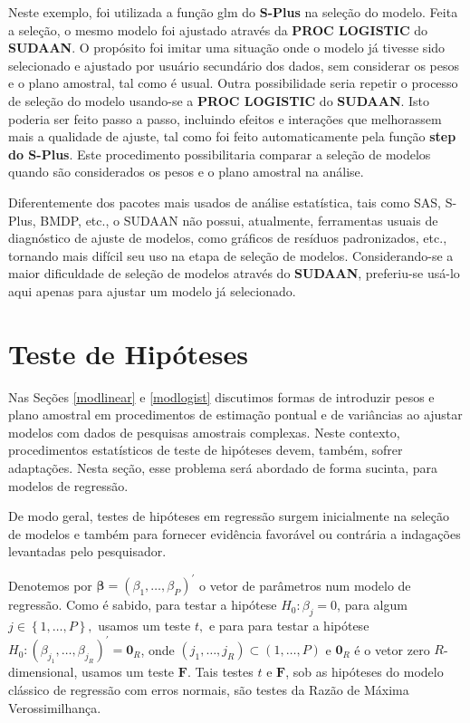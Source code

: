 \documentclass[]{book}
\numberwithin{example}{chapter}
\numberwithin{remark}{chapter}
\numberwithin{definition}{chapter}
\begin{document}
Neste exemplo, foi utilizada a função glm do \textbf{S-Plus} na seleção
do modelo. Feita a seleção, o mesmo modelo foi ajustado através da
\textbf{PROC LOGISTIC} do \textbf{SUDAAN}. O propósito foi imitar uma
situação onde o modelo já tivesse sido selecionado e ajustado por
usuário secundário dos dados, sem considerar os pesos e o plano
amostral, tal como é usual. Outra possibilidade seria repetir o processo
de seleção do modelo usando-se a \textbf{PROC LOGISTIC} do
\textbf{SUDAAN}. Isto poderia ser feito passo a passo, incluindo efeitos
e interações que melhorassem mais a qualidade de ajuste, tal como foi
feito automaticamente pela função \textbf{step do S-Plus}. Este
procedimento possibilitaria comparar a seleção de modelos quando são
considerados os pesos e o plano amostral na análise.

Diferentemente dos pacotes mais usados de análise estatística, tais como
SAS, S-Plus, BMDP, etc., o SUDAAN não possui, atualmente, ferramentas
usuais de diagnóstico de ajuste de modelos, como gráficos de resíduos
padronizados, etc., tornando mais difícil seu uso na etapa de seleção de
modelos. Considerando-se a maior dificuldade de seleção de modelos
através do \textbf{SUDAAN}, preferiu-se usá-lo aqui apenas para ajustar
um modelo já selecionado.

\section{Teste de Hipóteses}\label{teste-de-hipoteses}

Nas Seções \ref{modlinear} e \ref{modlogist} discutimos formas de
introduzir pesos e plano amostral em procedimentos de estimação pontual
e de variâncias ao ajustar modelos com dados de pesquisas amostrais
complexas. Neste contexto, procedimentos estatísticos de teste de
hipóteses devem, também, sofrer adaptações. Nesta seção, esse problema
será abordado de forma sucinta, para modelos de regressão.

De modo geral, testes de hipóteses em regressão surgem inicialmente na
seleção de modelos e também para fornecer evidência favorável ou
contrária a indagações levantadas pelo pesquisador.

Denotemos por
\(\mathbf{\beta }=\left( \beta _{1},\ldots ,\beta _{P}\right) ^{\prime }\)
o vetor de parâmetros num modelo de regressão. Como é sabido, para
testar a hipótese \(H_{0}:\beta _{j}=0\), para algum
\(j\in \left\{ 1,\ldots ,P\right\} \mathbf{,}\) usamos um teste \(t,\) e
para para testar a hipótese
\(H_{0}:\left( \beta _{j_{1}},\ldots ,\beta _{j_{R}}\right) ^{\prime }=\mathbf{0}_{R}\),
onde
\(\left( j_{1},\ldots ,j_{R}\right) \subset \left( 1,\ldots ,P\right)\)
e \(\mathbf{0}_{R}\) é o vetor zero \(R\)-dimensional, usamos um teste
\(\mathbf{F}\). Tais testes \(t\) e \(\mathbf{F}\), sob as hipóteses do
modelo clássico de regressão com erros normais, são testes da Razão de
Máxima Verossimilhança.
\end{document}
